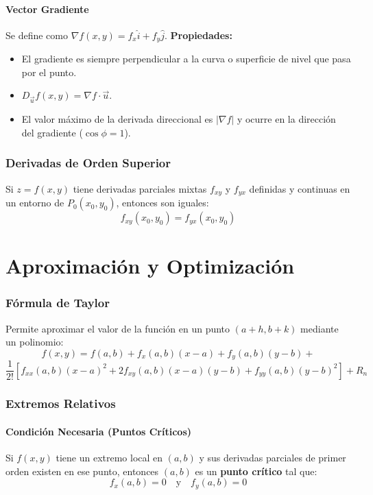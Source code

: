\documentclass[a4paper,12pt]{article}
\begin{document}
\subsection{Vector Gradiente}
Se define como $\nabla f(x,y) = f_x \hat{i} + f_y \hat{j}$.
\textbf{Propiedades:}
\begin{itemize}
    \item El gradiente es siempre perpendicular a la curva o superficie de nivel que pasa por el punto.
    \item $D_{\vec{u}}f(x,y) = \nabla f \cdot \vec{u}$.
    \item El valor máximo de la derivada direccional es $|\nabla f|$ y ocurre en la dirección del gradiente ($\cos\phi = 1$).
\end{itemize}

\section{Derivadas de Orden Superior}

\begin{tcolorbox}[title=Teorema de Schwarz (Conmutabilidad),colback=blue!5!white,colframe=blue!75!black]
    Si $z = f(x,y)$ tiene derivadas parciales mixtas $f_{xy}$ y $f_{yx}$ definidas y continuas en un entorno de $P_0(x_0,y_0)$, entonces son iguales:
    $$ f_{xy}(x_0,y_0) = f_{yx}(x_0,y_0) $$
\end{tcolorbox}

\newpage
\part{Aproximación y Optimización}

\section{Fórmula de Taylor}
Permite aproximar el valor de la función en un punto $(a+h, b+k)$ mediante un polinomio:
$$ f(x,y) = f(a,b) + f_x(a,b)(x-a) + f_y(a,b)(y-b) + $$
$$ \frac{1}{2!} \left[ f_{xx}(a,b)(x-a)^2 + 2f_{xy}(a,b)(x-a)(y-b) + f_{yy}(a,b)(y-b)^2 \right] + R_n $$

\section{Extremos Relativos}

\subsection{Condición Necesaria (Puntos Críticos)}
Si $f(x,y)$ tiene un extremo local en $(a,b)$ y sus derivadas parciales de primer orden existen en ese punto, entonces $(a,b)$ es un \textbf{punto crítico} tal que:
$$ f_x(a,b) = 0 \quad \text{y} \quad f_y(a,b) = 0 $$
\end{document}
